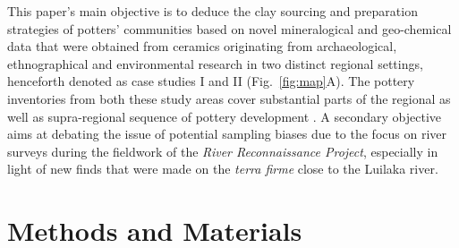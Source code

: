 \documentclass[preprint,10pt,oneside,onecolumn,authoryear]{elsarticle}
\begin{document}
This paper's main objective is to deduce the clay sourcing and preparation strategies of potters' communities based on novel mineralogical and geo-chemical data that were obtained from ceramics originating from archaeological, ethnographical and environmental research in two distinct regional settings, henceforth denoted as case studies I and II (Fig.~\ref{fig:map}A). The pottery inventories from both these study areas cover substantial parts of the regional as well as supra-regional sequence of pottery development \citep[Fig.~\ref{fig:chrono};][]{Wotzka.1995,Seidensticker.2021e}. A secondary objective aims at debating the issue of potential sampling biases due to the focus on river surveys during the fieldwork of the \textit{River Reconnaissance Project}, especially in light of new finds that were made on the \textit{terra firme} close to the Luilaka river.

\section{Methods and Materials}
\end{document}
